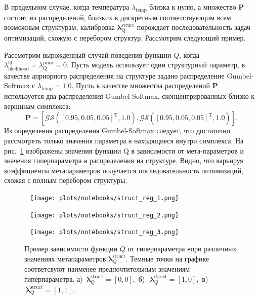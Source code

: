 В предельном случае, когда температура $\lambda_\text{temp}$ близка к нулю, а множество $\mathbf{P}$ состоит из распределений, близких к дискретным соответствующим всем возможным структурам, калибровка $\boldsymbol{\lambda}^\text{struct}_\text{Q}$ порождает последовательность задач оптимизаций, схожую с перебором структур. Рассмотрим следующий пример. 

\begin{example} 
Рассмотрим вырожденный случай поведения функции $Q$, когда $\lambda_\text{likelihood}^\text{Q} = \lambda^\text{prior}_\text{Q} = 0$. Пусть модель использует один структурный параметр, в качестве априорного распределения на структуре задано распределение Gumbel-Softmax с $\lambda_\text{temp}=1.0$. Пусть в качестве множества распределений $\mathbf{P}$ используется два распределения Gumbel-Softmax, сконцентрированных близко к вершинам симплекса:
\[
    \mathbf{P} = [\mathcal{GS}([0.95, 0.05, 0.05]^\text{T}, 1.0) ,\mathcal{GS}([0.95, 0.05, 0.05]^\text{T}, 1.0)].
\]
Из определения распределения Gumbel-Softmax следует, что достаточно рассмотреть только значения параметра $\mathbf{s}$ находящиеся внутри симплекса.
На рис.~\ref{fig:gs_comb} изображены значения функции Q в зависимости от мета-параметров и значения гиперпараметра $\mathbf{s}$ распределения на структуре. Видно, что варьируя  коэффициенты метапараметров получается последовательность оптимизаций, схожая с полным перебором структуры.
\end{example}


\begin{figure}
 \begin{minipage}[t]{.32\textwidth}
   \texttt{[image: plots/notebooks/struct\_reg\_1.png]}
\subcaption{}
\end{minipage}
\hfill
 \begin{minipage}[t]{.32\textwidth}
   \texttt{[image: plots/notebooks/struct\_reg\_2.png]}
\subcaption{}
\end{minipage}
\hfill
 \begin{minipage}[t]{.32\textwidth}
   \texttt{[image: plots/notebooks/struct\_reg\_3.png]}
\subcaption{}
\end{minipage}

\caption{Пример зависимости функции $Q$ от гиперпараметра $\mathbf{s}$при различных значениях метапараметров $\boldsymbol{\lambda}^\text{struct}_Q$. Темные точки на графике соответсвуют наименее предпочтительным значениям гиперпараметра. а)~$\boldsymbol{\lambda}^\text{struct}_Q = [0,0],$ б)~$~\boldsymbol{\lambda}^\text{struct}_Q = [1,0],$ в)~$~\boldsymbol{\lambda}^\text{struct}_Q = [1,1].$}
\label{fig:gs_comb}

\end{figure}

